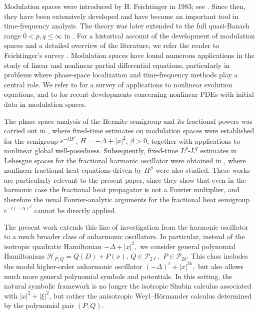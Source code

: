 \documentclass[12pt, reqno]{amsart}
\theoremstyle{definition}
\theoremstyle{remark}
\numberwithin{equation}{section}
\begin{document}
Modulation spaces were introduced by H. Feichtinger in 1983; see \cite{feich:mod}. Since then, they have been extensively developed and have become an important tool in time-frequency analysis. The theory was later extended to the full quasi-Banach range $0<p,q\leq \infty$ in \cite{G}. For a historical account of the development of modulation spaces and a detailed overview of the literature, we refer the reader to Feichtinger's survey \cite{feich:hist}. Modulation spaces have found numerous applications in the study of linear and nonlinear partial differential equations, particularly in problems where phase-space localization and time-frequency methods play a central role. We refer to \cite{RSW12} for a survey of applications to nonlinear evolution equations, and to \cite{cp:cp1} for recent developments concerning nonlinear PDEs with initial data in modulation spaces.

The phase space analysis of the Hermite semigroup and its fractional powers was carried out in \cite{than:hs}, where fixed-time estimates on modulation spaces were established for the semigroup $e^{-tH^\beta}$, $H=-\Delta+|x|^2$, $\beta>0$, together with applications to nonlinear global well-posedness. Subsequently, fixed-time $L^p$-$L^q$ estimates in Lebesgue spaces for the fractional harmonic oscillator were obtained in \cite{than:hs1}, where nonlinear fractional heat equations driven by $H^\beta$ were also studied. These works are particularly relevant to the present paper, since they show that even in the harmonic case the fractional heat propagator is not a Fourier multiplier, and therefore the usual Fourier-analytic arguments for the fractional heat semigroup $e^{-t(-\Delta)^\beta}$ cannot be directly applied.

The present work extends this line of investigation from the harmonic oscillator to a much broader class of anharmonic oscillators. In particular, instead of the isotropic quadratic Hamiltonian $-\Delta+|x|^2,$ we consider general polynomial Hamiltonians $\mathcal H_{P,Q}=Q(D)+P(x),
\,
Q\in\mathcal P_{2\ell}, \,\, P\in\mathcal P_{2k}.$
This class includes the model higher-order anharmonic oscillator $(-\Delta)^\ell+|x|^{2k},$
but also allows much more general polynomial symbols and potentials. In this setting, the natural symbolic framework is no longer the isotropic Shubin calculus associated with $|x|^2+|\xi|^2$, but rather the anisotropic Weyl--H\"ormander calculus determined by the polynomial pair $(P,Q)$.
\end{document}
